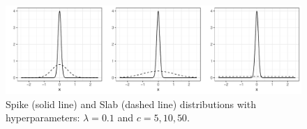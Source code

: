 \documentclass[
  12pt,
]{book}
\theoremstyle{break}
\theoremstyle{nonumberplain}
\begin{document}
\begin{figure}[h]

{\centering \includegraphics{Dynamic-Shrinkage-in-Bayesian-Structural-Time-Series-and-Vector-Autoregressive-Models_files/figure-latex/myfig1-1} 

}

\caption{Spike (solid line) and Slab (dashed line) distributions with hyperparameters: $\lambda=0.1$ and $c = 5, 10, 50$.}\label{fig:myfig1}
\end{figure}
\end{document}
